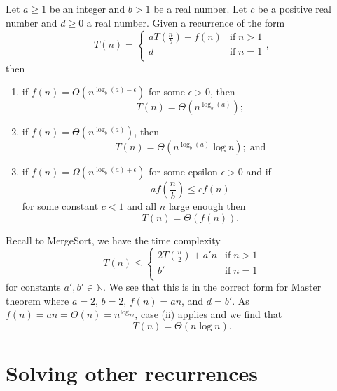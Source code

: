 \begin{theorem}
    Let $a\geq 1$ be an integer and $b>1$ be a real number. Let $c$ be a positive real number and $d\geq 0$ a real number. Given a recurrence of the form 
    \[
        T(n)=
        \begin{cases}
            aT\left(\frac nb\right)+f(n)&\text{if}\;n>1\\
            d&\text{if}\;n=1\\
        \end{cases}
        ,
    \]
    then
    \begin{enumerate}
        \item if $f(n)=O(n^{\log_b(a)-\epsilon})$ for some $\epsilon>0$, then \[T(n)=\Theta(n^{\log_b(a)});\]
        
        \item if $f(n)=\Theta(n^{\log_b(a)})$, then \[T(n)=\Theta(n^{\log_b(a)}\log{n});\;\text{and}\]
        
        \item if $f(n)=\Omega(n^{\log_b(a)+\epsilon})$ for some epsilon $\epsilon>0$ and if \[af\left(\frac nb\right)\leq cf(n)\] for some constant $c<1$ and all $n$ large enough then \[T(n)=\Theta(f(n)).\]
    \end{enumerate}
\end{theorem}

\begin{example}
    Recall to MergeSort, we have the time complexity
    \[
        T(n)\leq
        \begin{cases}
            2T(\frac n2)+a'n&\text{if}\;n>1\\
            b'&\text{if}\;n=1\\
        \end{cases}
    \]
    for constants $a',b'\in\mathbb N$. We see that this is in the correct form for Master theorem where $a=2$, $b=2$, $f(n)=an$, and $d=b'$. As $f(n)=an=\Theta(n)=n^{\log_22}$, case (ii) applies and we find that \[T(n)=\Theta(n\log n).\]
\end{example}

\section{Solving other recurrences}

